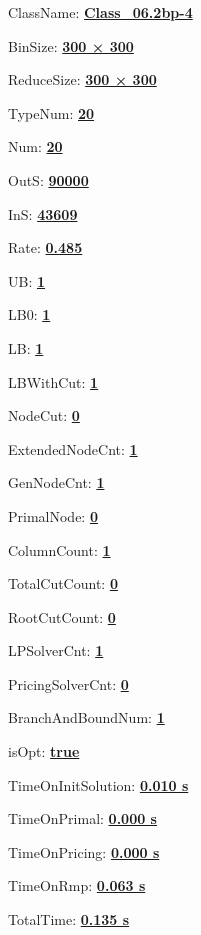 \documentclass[11pt]{article}
\begin{document}
\pagestyle{empty}


ClassName: \underline{\textbf{Class_06.2bp-4}}
\par
BinSize: \underline{\textbf{300 × 300}}
\par
ReduceSize: \underline{\textbf{300 × 300}}
\par
TypeNum: \underline{\textbf{20}}
\par
Num: \underline{\textbf{20}}
\par
OutS: \underline{\textbf{90000}}
\par
InS: \underline{\textbf{43609}}
\par
Rate: \underline{\textbf{0.485}}
\par
UB: \underline{\textbf{1}}
\par
LB0: \underline{\textbf{1}}
\par
LB: \underline{\textbf{1}}
\par
LBWithCut: \underline{\textbf{1}}
\par
NodeCut: \underline{\textbf{0}}
\par
ExtendedNodeCnt: \underline{\textbf{1}}
\par
GenNodeCnt: \underline{\textbf{1}}
\par
PrimalNode: \underline{\textbf{0}}
\par
ColumnCount: \underline{\textbf{1}}
\par
TotalCutCount: \underline{\textbf{0}}
\par
RootCutCount: \underline{\textbf{0}}
\par
LPSolverCnt: \underline{\textbf{1}}
\par
PricingSolverCnt: \underline{\textbf{0}}
\par
BranchAndBoundNum: \underline{\textbf{1}}
\par
isOpt: \underline{\textbf{true}}
\par
TimeOnInitSolution: \underline{\textbf{0.010 s}}
\par
TimeOnPrimal: \underline{\textbf{0.000 s}}
\par
TimeOnPricing: \underline{\textbf{0.000 s}}
\par
TimeOnRmp: \underline{\textbf{0.063 s}}
\par
TotalTime: \underline{\textbf{0.135 s}}
\par
\newpage
\end{document}
